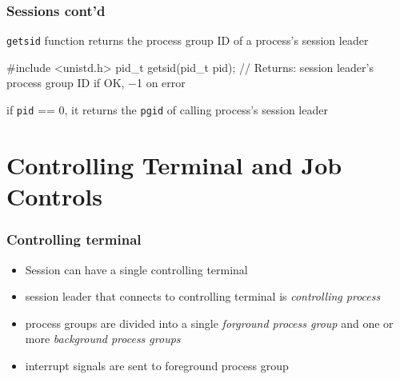 \documentclass[newPxFont,sthlmFooter,nooffset]{beamer}
\begin{document}
\begin{frame}[fragile,t]
  \frametitle{Sessions cont'd}
\texttt{getsid} function returns the process group ID of a process's session leader

\begin{codedef}
#include <unistd.h>
pid_t getsid(pid_t pid);
// Returns: session leader’s process group ID if OK, −1 on error
\end{codedef}

if \texttt{pid} == 0, it returns the \texttt{pgid} of calling process's session leader
\end{frame}



\section{Controlling Terminal and Job Controls}

\begin{frame}[t]
  \frametitle{Controlling terminal}
\begin{itemize}
\item Session can have a single controlling terminal
\item session leader that connects to controlling terminal is \textit{controlling process}
\item process groups are divided into a single \textit{forground process group} and one or more \textit{background process groups}
\item interrupt signals are sent to foreground process group
\end{itemize}
\end{frame}
\end{document}
